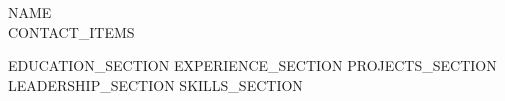 \documentclass[{{PAPER_FORMAT}},11pt]{article}
\begin{document}
\begin{center}
    {\Large \scshape {{NAME}}} \\[2mm]
    \footnotesize \raisebox{-0.1\height}
    {{CONTACT_ITEMS}}
    \vspace{-8pt}
\end{center}

{{EDUCATION_SECTION}}
{{EXPERIENCE_SECTION}}
{{PROJECTS_SECTION}}
{{LEADERSHIP_SECTION}}
{{SKILLS_SECTION}}

\vspace{-15pt}
\end{document}
